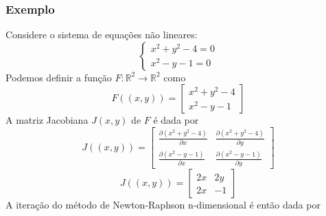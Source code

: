 \subsubsection{Exemplo}
Considere o sistema de equações não lineares:
\begin{equation*}
    \begin{cases}
    x^2 + y^2 - 4 = 0 \\
    x^2 - y - 1 = 0
    \end{cases}
\end{equation*}
Podemos definir a função \(F : \mathbb{R}^2 \rightarrow \mathbb{R}^2\) como
\begin{equation*}
    F((x, y)) = \begin{bmatrix}
                    x^2 + y^2 - 4 \\
                    x^2 - y - 1
                \end{bmatrix}
\end{equation*}
A matriz Jacobiana \(J(x, y)\) de \(F\) é dada por
\begin{equation*}
    J((x, y)) = \begin{bmatrix}
        \frac{\partial ( x^2 + y^2 - 4 )}{\partial x} & \frac{\partial ( x^2 + y^2 - 4 )}{\partial y} \\
        \frac{\partial ( x^2 - y - 1 )}{\partial x} & \frac{\partial ( x^2 - y - 1 )}{\partial y}
    \end{bmatrix}
\end{equation*}
\begin{equation*}
    J((x, y)) = \begin{bmatrix}
        2x & 2y \\
        2x & -1
    \end{bmatrix}
\end{equation*}
A iteração do método de Newton-Raphson n-dimensional é então dada por
